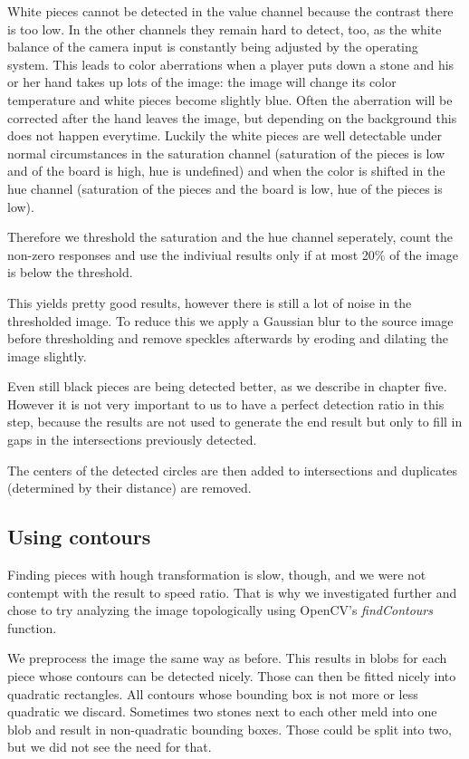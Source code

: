 	White pieces cannot be detected in the value channel because the contrast there is too low. In the other channels they remain hard to detect, too, as the white balance of the camera input is constantly being adjusted by the operating system. This leads to color aberrations when a player puts down a stone and his or her hand takes up lots of the image: the image will change its color temperature and white pieces become slightly blue. Often the aberration will be corrected after the hand leaves the image, but depending on the background this does not happen everytime. Luckily the white pieces are well detectable under normal circumstances in the saturation channel (saturation of the pieces is low and of the board is high, hue is undefined) and when the color is shifted in the hue channel (saturation of the pieces and the board is low, hue of the pieces is low).

	Therefore we threshold the saturation and the hue channel seperately, count the non-zero responses and use the indiviual results only if at most 20\% of the image is below the threshold.

	This yields pretty good results, however there is still a lot of noise in the thresholded image. To reduce this we apply a Gaussian blur to the source image before thresholding and remove speckles afterwards by eroding and dilating the image slightly.

	Even still black pieces are being detected better, as we describe in chapter five. However it is not very important to us to have a perfect detection ratio in this step, because the results are not used to generate the end result but only to fill in gaps in the intersections previously detected.

	The centers of the detected circles are then added to intersections and duplicates (determined by their distance) are removed.

	\subsection{Using contours}
	\label{detector-occluded-contours}
	Finding pieces with hough transformation is slow, though, and we were not contempt with the result to speed ratio. That is why we investigated further and chose to try analyzing the image topologically using OpenCV's \emph{findContours} function.

	We preprocess the image the same way as before. This results in blobs for each piece whose contours can be detected nicely. Those can then be fitted nicely into quadratic rectangles. All contours whose bounding box is not more or less quadratic we discard. Sometimes two stones next to each other meld into one blob and result in non-quadratic bounding boxes. Those could be split into two, but we did not see the need for that.

